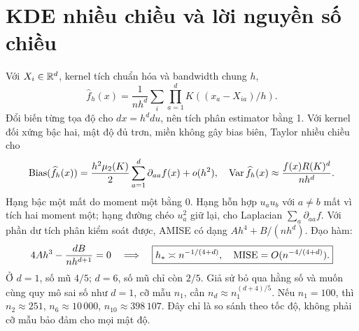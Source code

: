 \section{KDE nhiều chiều và lời nguyền số chiều}
Với $X_i\in\mathbb R^d$, kernel tích chuẩn hóa và bandwidth chung $h$,
\[
\widehat f_h(x)=\frac1{nh^d}\sum_i
\prod_{a=1}^dK((x_a-X_{ia})/h).
\]
Đổi biến từng tọa độ cho $dx=h^ddu$, nên tích phân estimator bằng 1.
Với kernel đối xứng bậc hai, mật độ đủ trơn, miền không gây bias biên,
Taylor nhiều chiều cho
\[
\operatorname{Bias}(\widehat f_h(x))=
\frac{h^2\mu_2(K)}2\sum_{a=1}^d\partial_{aa}f(x)+o(h^2),
\quad
\operatorname{Var}\widehat f_h(x)\approx\frac{f(x)R(K)^d}{nh^d}.
\]
Hạng bậc một mất do moment một bằng 0. Hạng hỗn hợp
$u_au_b$ với $a\ne b$ mất vì tích hai moment một; hạng đường chéo
$u_a^2$ giữ lại, cho Laplacian $\sum_a\partial_{aa}f$.
Với phần dư tích phân kiểm soát được, AMISE có dạng
$Ah^4+B/(nh^d)$. Đạo hàm:
\[
4Ah^3-\frac{dB}{nh^{d+1}}=0
\quad\Longrightarrow\quad
\boxed{h_*\asymp n^{-1/(4+d)},\quad\operatorname{MISE}=O(n^{-4/(4+d)}).}
\]
Ở $d=1$, số mũ $4/5$; $d=6$, số mũ chỉ còn $2/5$.
Giả sử bỏ qua hằng số và muốn cùng quy mô sai số như $d=1$, cỡ mẫu
$n_1$, cần $n_d\approx n_1^{(d+4)/5}$.
Nếu $n_1=100$, thì $n_2\approx251$, $n_6\approx10\,000$,
$n_{10}\approx398\,107$. Đây chỉ là so sánh theo tốc độ, không phải
cỡ mẫu bảo đảm cho mọi mật độ.
